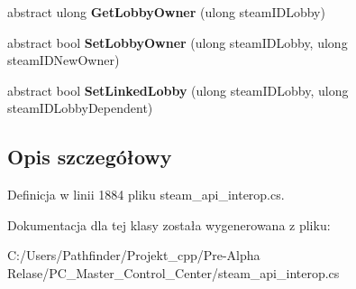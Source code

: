 \begin{DoxyCompactItemize}
\mbox{\label{class_valve_1_1_steamworks_1_1_i_steam_matchmaking_ab180f538d1c2062a6e315d4b39d2ddb6}} 
abstract ulong {\bfseries Get\+Lobby\+Owner} (ulong steam\+I\+D\+Lobby)
\item 
\mbox{\label{class_valve_1_1_steamworks_1_1_i_steam_matchmaking_a7bf3b87a95ee0b8493d88f4955d2df91}} 
abstract bool {\bfseries Set\+Lobby\+Owner} (ulong steam\+I\+D\+Lobby, ulong steam\+I\+D\+New\+Owner)
\item 
\mbox{\label{class_valve_1_1_steamworks_1_1_i_steam_matchmaking_a2610b64c2285e656a044ee7ac0f6fb12}} 
abstract bool {\bfseries Set\+Linked\+Lobby} (ulong steam\+I\+D\+Lobby, ulong steam\+I\+D\+Lobby\+Dependent)
\end{DoxyCompactItemize}


\subsection{Opis szczegółowy}


Definicja w linii 1884 pliku steam\+\_\+api\+\_\+interop.\+cs.



Dokumentacja dla tej klasy została wygenerowana z pliku\+:\begin{DoxyCompactItemize}
\item 
C\+:/\+Users/\+Pathfinder/\+Projekt\+\_\+cpp/\+Pre-\/\+Alpha Relase/\+P\+C\+\_\+\+Master\+\_\+\+Control\+\_\+\+Center/steam\+\_\+api\+\_\+interop.\+cs\end{DoxyCompactItemize}

